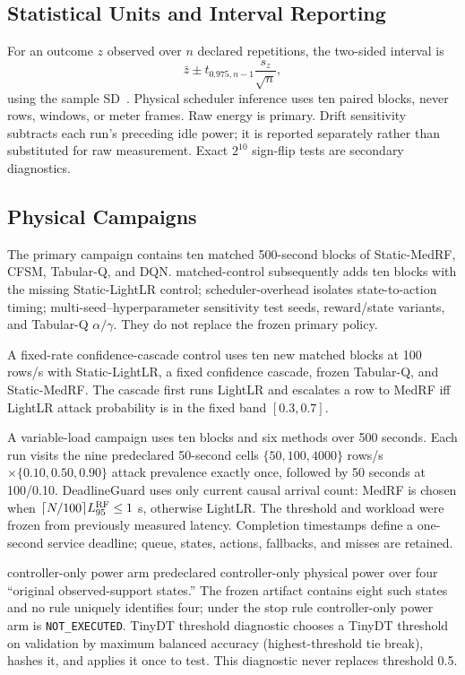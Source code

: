 \subsection{Statistical Units and Interval Reporting}
For an outcome $z$ observed over $n$ declared repetitions, the two-sided interval is
\begin{equation}\label{eq:tci}
 \bar z \pm t_{0.975,n-1}\frac{s_z}{\sqrt n},
\end{equation}
using the sample SD~\cite{NISTMean}. Physical scheduler inference uses ten paired blocks, never rows, windows, or meter frames. Raw energy is primary. Drift sensitivity subtracts each run's preceding idle power; it is reported separately rather than substituted for raw measurement. Exact $2^{10}$ sign-flip tests are secondary diagnostics.

\subsection{Physical Campaigns}
The primary campaign contains ten matched 500-second blocks of Static-MedRF, CFSM, Tabular-Q, and DQN. matched-control subsequently adds ten blocks with the missing Static-LightLR control; scheduler-overhead isolates state-to-action timing; multi-seed--hyperparameter sensitivity test seeds, reward/state variants, and Tabular-Q $\alpha/\gamma$. They do not replace the frozen primary policy.

A fixed-rate confidence-cascade control uses ten new matched blocks at 100 rows/s with Static-LightLR, a fixed confidence cascade, frozen Tabular-Q, and Static-MedRF. The cascade first runs LightLR and escalates a row to MedRF iff LightLR attack probability is in the fixed band $[0.3,0.7]$.

A variable-load campaign uses ten blocks and six methods over 500 seconds. Each run visits the nine predeclared 50-second cells $\{50,100,4000\}$ rows/s $\times\{0.10,0.50,0.90\}$ attack prevalence exactly once, followed by 50 seconds at 100/0.10. DeadlineGuard uses only current causal arrival count: MedRF is chosen when $\lceil N/100\rceil L_{95}^{\rm RF}\le1$ s, otherwise LightLR. The threshold and workload were frozen from previously measured latency. Completion timestamps define a one-second service deadline; queue, states, actions, fallbacks, and misses are retained.

controller-only power arm predeclared controller-only physical power over four ``original observed-support states.'' The frozen artifact contains eight such states and no rule uniquely identifies four; under the stop rule controller-only power arm is \texttt{NOT\_EXECUTED}. TinyDT threshold diagnostic chooses a TinyDT threshold on validation by maximum balanced accuracy (highest-threshold tie break), hashes it, and applies it once to test. This diagnostic never replaces threshold 0.5.
